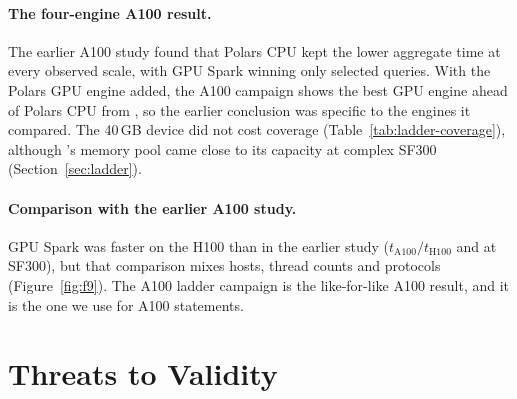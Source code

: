 \documentclass[11pt]{article}
\begin{document}
\paragraph{The four-engine A100 result.} The earlier A100 study found that
Polars CPU kept the lower aggregate time at every observed scale, with GPU
Spark winning only selected queries. With the Polars GPU engine added, the
A100 campaign shows the best GPU engine ahead of Polars CPU from
, so the earlier conclusion was
specific to the engines it compared. The 40\,GB device did not cost coverage
(Table~\ref{tab:ladder-coverage}), although \polarsgpu{}'s memory pool came
close to its capacity at complex SF300 (Section~\ref{sec:ladder}).
\fi
\fi

\paragraph{Comparison with the earlier A100 study.} GPU Spark was faster on the
H100 than in the earlier study ($t_{\mathrm{A100}}/t_{\mathrm{H100}}$
 and
 at SF300), but that
comparison mixes hosts, thread counts and protocols (Figure~\ref{fig:f9}). The
A100 ladder campaign is the like-for-like A100 result, and it is the one we use
for A100 statements.

\section{Threats to Validity}
\label{sec:threats}
\end{document}
